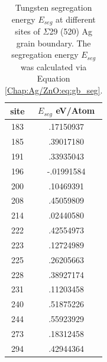 \begin{table}[!ht]
\caption[Tungsten segregation energy $E_{seg}$ at different sites of Ag $\Sigma$29 (520) grain boundary.]{Tungsten segregation energy $E_{seg}$ at different sites of $\Sigma$29 (520) Ag grain boundary. The segregation energy $E_{seg}$ was calculated via Equation \ref{Chap:Ag/ZnO:eq:gb_seg}.}
\label{Chap:Ag/ZnO:tab3}
\centering
\begin{tabular}{cc}
\hline
\hline
site & $E_{seg}$ eV/Atom \\ 
\hline
183  & .17150937         \\
185  & .39017180         \\
191  & .33935043         \\
196  & -.01991584        \\
200  & .10469391         \\
208  & .45059809         \\
214  & .02440580         \\
222  & .42554973         \\
223  & .12724989         \\
225  & .26205663         \\
228  & .38927174         \\
231  & .11203458         \\
240  & .51875226         \\
244  & .55923929         \\
273  & .18312458         \\
294  & .42944364         \\ 
\hline
\hline
\end{tabular}
\end{table}